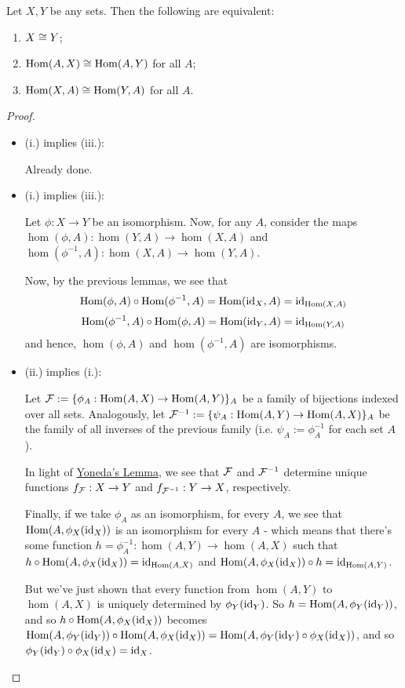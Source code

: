 \begin{cor}
	Let $X,Y$ be any sets. Then the following are equivalent:
	\begin{enumerate}[(i.)]
		\item $X\cong Y$;
		\item $\mathrm{Hom}(A,X)\cong\mathrm{Hom}(A,Y)$ for all $A$;
		\item $\mathrm{Hom}(X,A)\cong\mathrm{Hom}(Y,A)$ for all $A$.
	\end{enumerate}
\end{cor}
\begin{proof}
	\begin{itemize}
		\item (i.) implies (iii.):
		
		Already done.
		
		\item (i.) implies (iii.):
		
		Let $\phi:X\to Y$ be an isomorphism. Now, for any $A$, consider the maps $\hom(\phi,A):\hom(Y,A)\to\hom(X,A)$ and $\hom(\phi^{-1},A):\hom(X,A)\to\hom(Y,A)$.
		
		Now, by the previous lemmas, we see that $$\mathrm{Hom}(\phi,A)\circ\mathrm{Hom}(\phi^{-1},A)=\mathrm{Hom}({\rm id}_X,A)={\rm id}_{\mathrm{Hom}(X,A)}$$ $$\mathrm{Hom}(\phi^{-1},A)\circ\mathrm{Hom}(\phi,A)=\mathrm{Hom}({\rm id}_Y,A)={\rm id}_{\mathrm{Hom}(Y,A)}$$and hence, $\hom(\phi,A)$ and $\hom(\phi^{-1},A)$ are isomorphisms.
		
		\item (ii.) implies (i.):
		
		Let $\mathcal F:=\{\phi_A:\mathrm{Hom}(A,X)\to\mathrm{Hom}(A,Y)\}_A$ be a family of bijections indexed over all sets. Analogously, let $\mathcal F^{-1}:=\{\psi_A:\mathrm{Hom}(A,Y)\to\mathrm{Hom}(A,X)\}_A$ be the family of all inverses of the previous family (i.e. $\psi_A:=\phi_A^{-1}$ for each set $A$).
		
		In light of \hyperref[thm:yoneda]{Yoneda's Lemma}, we see that $\mathcal F$ and $\mathcal F^{-1}$ determine unique functions $f_\mathcal F:X\to Y$ and $f_{\mathcal F^{-1}}:Y\to X$, respectively.
	
		Finally, if we take $\phi_A$ as an isomorphism, for every $A$, we see that $\mathrm{Hom}(A,\phi_X({\rm id}_X))$ is an isomorphism for every $A$ - which means that there's some function $h=\phi_A^{-1}:\hom(A,Y)\to\hom(A,X)$ such that $h\circ\mathrm{Hom}(A,\phi_X({\rm id}_X))={\rm id}_{\mathrm{Hom}(A,X)}$ and $\mathrm{Hom}(A,\phi_X({\rm id}_X))\circ h={\rm id}_{\mathrm{Hom}(A,Y)}$.
		
		But we've just shown that every function from $\hom(A,Y)$ to $\hom(A,X)$ is uniquely determined by $\phi_Y({\rm id}_Y)$. So $h=\mathrm{Hom}(A,\phi_Y({\rm id}_Y))$, and so $h\circ\mathrm{Hom}(A,\phi_X({\rm id}_X))$ becomes $\mathrm{Hom}(A,\phi_Y({\rm id}_Y))\circ\mathrm{Hom}(A,\phi_X({\rm id}_X))=\mathrm{Hom}(A,\phi_Y({\rm id}_Y)\circ\phi_X({\rm id}_X))$, and so $\phi_Y({\rm id}_Y)\circ\phi_X({\rm id}_X)={\rm id}_X$.
		

\end{itemize}
\end{proof}
